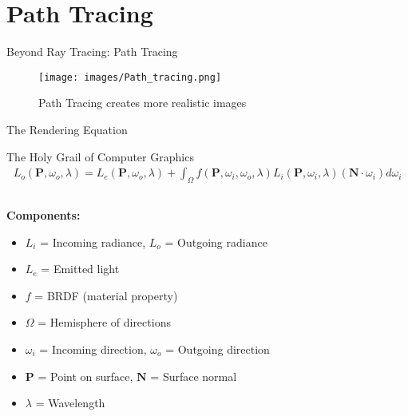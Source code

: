 \section{Path Tracing}

\begin{frame}{Beyond Ray Tracing: Path Tracing}
  \begin{center}
    \begin{figure}
      \texttt{[image: images/Path\_tracing.png]}
      \caption*{Path Tracing creates more realistic images}
    \end{figure}
  \end{center}
\end{frame}

\begin{frame}{The Rendering Equation}
  \begin{center}
    \begin{mathbox}{The Holy Grail of Computer Graphics}
      \small
      \begin{align*}
        L_o(\mathbf{P}, \omega_o, \lambda) = L_e(\mathbf{P}, \omega_o, \lambda) + \int_\Omega f(\mathbf{P}, \omega_i, \omega_o, \lambda) L_i(\mathbf{P}, \omega_i, \lambda) (\mathbf{N} \cdot \omega_i) d\omega_i
      \end{align*}
    \end{mathbox}
  \end{center}

  \begin{columns}
    \begin{column}{0.6\textwidth}
      \scriptsize
      \textbf{Components:}
      \begin{itemize}
        \item $L_i$ = Incoming radiance, $L_o$ = Outgoing radiance
        \item $L_e$ = Emitted light
        \item $f$ = BRDF (material property)
        \item $\Omega$ = Hemisphere of directions
        \item $\omega_i$ = Incoming direction, $\omega_o$ = Outgoing direction
        \item $\mathbf{P}$ = Point on surface, $\mathbf{N}$ = Surface normal
        \item $\lambda$ = Wavelength
      \end{itemize}
    \end{column}
    \begin{column}{0.4\textwidth}
      \scriptsize
\end{column}
\end{columns}
\end{frame}
